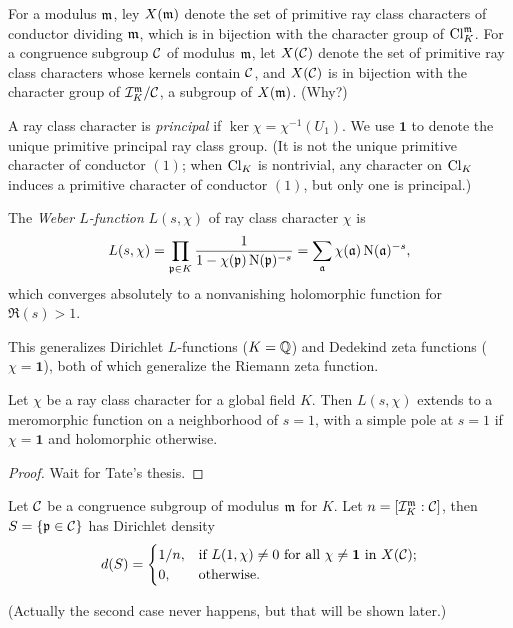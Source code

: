 \documentclass[11pt]{amsart}
\begin{document}
For a modulus $\mathfrak{m}$, ley $X(\mathfrak{m})$ denote the set of primitive ray class characters of conductor
dividing $\mathfrak{m}$, which is in bijection with the character group of $\operatorname{Cl}_K^{\mathfrak{m}}$. For a congruence subgroup $\mathcal{C}$ of modulus $\mathfrak{m}$, let $X(\mathcal{C})$ denote the set of primitive ray class characters
whose kernels contain $\mathcal{C}$, and $X(\mathcal{C})$ is in bijection with the character group of $\mathcal{I}_K^{\mathfrak{m}}/\mathcal{C}$, a subgroup of $X(\mathfrak{m})$. (Why?)


\begin{defn}
    A ray class character is \emph{principal} if $\ker\chi = \chi^{-1}(U_1)$. We use $\mathbf{1}$ to denote the unique primitive principal ray class group. (It is not the unique primitive character of conductor $(1)$; when $\operatorname{Cl}_K$ is nontrivial, any character on $\operatorname{Cl}_K$ induces a primitive character of conductor $(1)$, but only one is principal.)
\end{defn}


\begin{defn}
The \emph{Weber $L$-function} $L(s,\chi)$ of ray class character $\chi$ is
\[L(s,\chi) = \prod_{\mathfrak{p}\in K} \frac{1}{1 - \chi(\mathfrak{p})\operatorname{N}(\mathfrak{p})^{-s}} = \sum_{\mathfrak{a}} \chi(\mathfrak{a})\operatorname{N}(\mathfrak{a})^{-s},\]
which converges absolutely to a nonvanishing holomorphic function for $\Re(s) > 1$.
\end{defn}

This generalizes Dirichlet $L$-functions ($K = \mathbb{Q}$) and Dedekind zeta functions ($\chi = \mathbf{1}$), both of which generalize the Riemann  zeta function.


\begin{prop}
    Let $\chi$ be a ray class character for a global field $K$. Then $L(s,\chi)$ extends to a meromorphic function on a neighborhood of $s=1$, with a simple pole at $s=1$ if $\chi = \mathbf{1}$ and holomorphic otherwise.
\end{prop}

\begin{proof}
    Wait for Tate's thesis.
\end{proof}


\begin{prop}
    Let $\mathcal{C}$ be a congruence subgroup of modulus $\mathfrak{m}$ for $K$. Let $n = [\mathcal{I}_K^{\mathfrak{m}}:\mathcal{C}]$, then $S = \{\mathfrak{p}\in \mathcal{C}\}$ has Dirichlet density
    \[d(S) = 
    \begin{cases}
    1/n, & \text{if } L(1, \chi) \neq 0 \text{ for all } \chi\neq \mathbf{1} \text{ in } X(\mathcal{C}); \\
    0, & \text{otherwise.}
    \end{cases}\]
\end{prop}
(Actually the second case never happens, but that will be shown later.)
\end{document}
